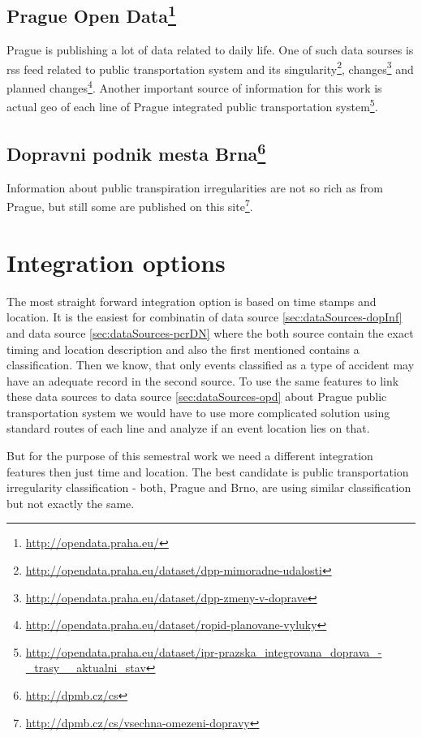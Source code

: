 \documentclass{article}
\begin{document}
\subsection{\label{sec:dataSources-opd}Prague Open Data\footnote{\url{http://opendata.praha.eu/}}}
Prague is publishing a lot of data related to daily life. One of such data sourses is rss feed related to public transportation system and its singularity\footnote{\url{http://opendata.praha.eu/dataset/dpp-mimoradne-udalosti}},  changes\footnote{\url{http://opendata.praha.eu/dataset/dpp-zmeny-v-doprave}} and planned changes\footnote{\url{http://opendata.praha.eu/dataset/ropid-planovane-vyluky}}. Another important source of information for this work is actual geo of each line of Prague integrated public transportation system\footnote{\url{http://opendata.praha.eu/dataset/ipr-prazska_integrovana_doprava_-_trasy__aktualni_stav}}.

\subsection{\label{sec:dataSources-brno-pt}Dopravni podnik mesta Brna\footnote{\url{http://dpmb.cz/cs}}}
Information about public transpiration irregularities are not so rich as from Prague, but still some are published on this site\footnote{\url{http://dpmb.cz/cs/vsechna-omezeni-dopravy}}.

\section{Integration options}

The most straight forward integration option is based on time stamps and location. It is the easiest for combinatin of data source \ref{sec:dataSources-dopInf} and data source \ref{sec:dataSources-pcrDN} where the both source contain the exact timing and location description and also the first mentioned contains a classification. Then we know, that only events classified as a type of accident may have an adequate record in the second source. To use the same features to link these data sources to data source \ref{sec:dataSources-opd} about Prague public transportation system we would have to use more complicated solution using standard routes of each line and analyze if an event location lies on that.

But for the purpose of this semestral work we need a different integration features then just time and location. The best candidate is public transportation irregularity classification - both, Prague and Brno, are using similar classification but not exactly the same.
\end{document}
